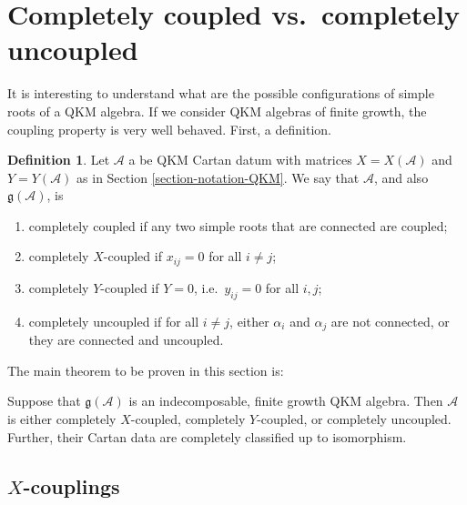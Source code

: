 \documentclass[12pt, a4paper, reqno]{amsart}
\def\AA{\mathcal{A}}
\def\g{\mathfrak{g}}
\theoremstyle{definition}
\newtheorem{definition}{Definition}
\theoremstyle{definition}
\theoremstyle{definition}
\numberwithin{theorem}{section}
\numberwithin{lemma}{section}
\numberwithin{remark}{section}
\numberwithin{definition}{section}
\numberwithin{corollary}{section}
\numberwithin{proposition}{section}
\numberwithin{example}{section}
\begin{document}
	\section{Completely coupled vs.~completely uncoupled}\label{section_coupled_v_uncoupled}
	
	It is interesting to understand what are the possible configurations of simple roots of a QKM algebra. If we consider QKM algebras of finite growth, the coupling property is very well behaved. First, a definition.
	
	\begin{definition}
		Let $\AA$ a be QKM Cartan datum with matrices $X=X(\AA)$ and $Y=Y(\AA)$ as in Section \ref{section-notation-QKM}.  We say that $\AA$, and also $\g(\AA)$, is 
		\begin{enumerate}
			\item completely coupled if any two simple roots that are connected are coupled;
			\item completely $X$-coupled if $x_{ij}=0$ for all $i\neq j$;
			\item completely $Y$-coupled if $Y=0$, i.e.~$y_{ij}=0$ for all $i,j$;
			\item completely uncoupled if for all $i\neq j$, either $\alpha_i$ and $\alpha_j$ are not connected, or they are connected and uncoupled.
		\end{enumerate}
	\end{definition}
	
	The main theorem to be proven in this section is:
	\begin{theorem}
		Suppose that $\g(\AA)$ is an indecomposable, finite growth QKM algebra.  Then $\AA$ is either completely $X$-coupled, completely $Y$-coupled, or completely uncoupled. Further, their Cartan data are completely classified up to isomorphism.
	\end{theorem}  
	
	\subsection{$X$-couplings}
	
\end{document}
